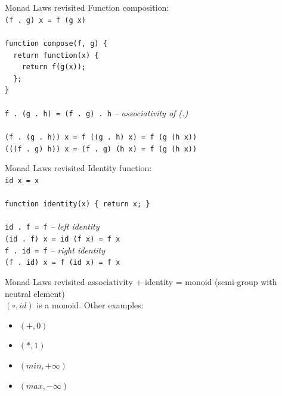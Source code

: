 \documentclass{beamer}
\begin{document}
\begin{frame}{Monad Laws revisited}
  Function composition: \\ \pause
  \texttt{(f\ .\ g) x = f (g x)} \\ \pause
  \ \\
  \texttt{function compose(f, g) \{ \\
    \ \ return function(x) \{ \\
    \ \ \ \ return f(g(x)); \\
    \ \ \}; \\
    \} } \\ \pause
  \ \\
  \texttt{f\ .\ (g\ .\ h) = (f\ .\ g)\ .\ h}
  \pause \textit{-- associativity of (.)} \\ \pause
  \ \\
  \texttt{(f\ .\ (g\ .\ h)) x \pause = f ((g\ .\ h) x) \pause = f (g (h x))} \\ \pause
  \texttt{(((f\ .\ g) h)) x \pause = (f\ .\ g) (h x) \pause = f (g (h x))} 
  
\end{frame}

\begin{frame}{Monad Laws revisited}
  Identity function: \\ \pause
  \texttt{id x = x} \\ \pause
  \ \\
  \texttt{function identity(x) \{ return x; \}} \\ \pause
  \ \\
  \texttt{id\ .\ f = f} \pause \textit{-- left identity} \\ \pause
  \texttt{(id\ .\ f) x \pause = id (f x) \pause = f x} \\ \pause
  \texttt{f\ .\ id = f} \pause \textit{-- right identity} \\ \pause
  \texttt{(f\ .\ id) x \pause = f (id x) \pause = f x}
\end{frame}

\begin{frame}{Monad Laws revisited}
  associativity + identity = monoid \pause (semi-group with neutral element) \\
  $(\circ, id)$ is a monoid. Other examples:\pause
  \begin{itemize}
  \item $(+, 0)$ \pause
  \item $(*, 1)$ \pause
  \item $(min, +\infty)$ \pause
  \item $(max, -\infty)$
  \end{itemize}
\end{frame}
\end{document}
